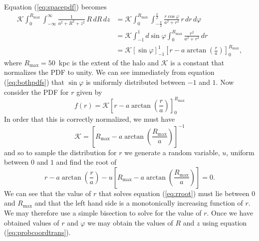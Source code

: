 Equation (\ref{eq:spacepdf}) becomes
\begin{equation}
\begin{split}
\mathcal{K} \int_0^{R_\mathrm{max}}\int_{-\infty}^{\infty} \frac{1}{a^2 + R^2 + z^2}\,R\, dR\, dz 
&= \mathcal{K} \int_0^{R_{\mathrm{max}}}\int_{-\frac{\pi}{2}}^{\frac{\pi}{2}} \frac{r\cos\varphi}{a^2+r^2}\,r\, dr \, d\varphi \\
&= \mathcal{K} \int_{-1}^{1} d\sin\varphi \int_0^{R_{\mathrm{max}}} \frac{r^2}{a^2+r^2}\, dr \\
&= \mathcal{K} \left[\sin\varphi\right]_{-1}^1 \left[r -
a\arctan\left(\frac{r}{a}\right)\right]_0^{R_{\mathrm{max}}},
\end{split}
\label{eq:bothpdfs}
\end{equation}
where $R_\mathrm{max} = 50$~kpc is the extent of the halo and $\mathcal{K}$ is
a constant that normalizes the PDF to unity. We can see immediately from
equation (\ref{eq:bothpdfs}) that $\sin\varphi$ is uniformly
distributed between $-1$ and $1$. Now consider the PDF for $r$ given by
\begin{equation}
f(r) = \mathcal{K} \left[r - a\arctan\left(\frac{r}{a}\right)\right]_0^{R_{\mathrm{max}}}
\end{equation}
In order that this is correctly normalized, we must have
\begin{equation}
\mathcal{K} = 
\left[R_\mathrm{max} -
a\arctan\left(\frac{R_\mathrm{max}}{a}\right)\right]^{-1}
\end{equation}
and so to sample the distribution for $r$ we generate a random variable, $u$,
uniform between $0$ and $1$ and find the root of
\begin{equation}
r - a\arctan\left(\frac{r}{a}\right) - u \left[R_\mathrm{max} -
a\arctan\left(\frac{R_\mathrm{max}}{a}\right)\right] = 0.
\label{eq:rroot}
\end{equation}
We can see that the value of $r$ that solves equation (\ref{eq:rroot}) must
lie between $0$ and $R_\mathrm{max}$ and that the left hand side is a
monotonically increasing function of $r$. We may therefore use a simple 
bisection to solve for the value of $r$. Once we have obtained values of $r$
and $\varphi$ we may obtain the values of $R$ and $z$ using equation
(\ref{eq:probcoordtrans}). 

